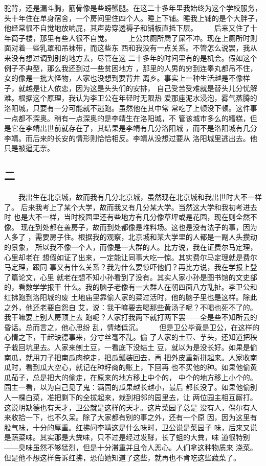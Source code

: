 驼背，还是漏斗胸，筋骨像是些螃蟹腿。在这二十多年里我始终为这个学校服务， 头十年住在单身宿舍，一个房间里住四个人。睡上下铺。睡我上铺的是个大胖子， 他经常很不自觉地放响屁，其声势穿透褥子和铺板直抵下层。 　　后来又住了十年筒子楼，那里有些人很不自觉。 　　上公共厕所屙了屎不冲。现在上厕所时则面对着—些乳罩和吊袜带，而这些东 西和我没有一点关系。不管怎么说罢，我从来没有想过调到别的地方去，尽管在这 二十多年的时间里有的是机会。假如这个例子不典型，那么我还到过一些贫困地方 ，那里的人男的穷到连睾丸都吊不住，女的像是一批大怪物，人家也没想到要背井 离乡。事实上一种生活越是不像样子，就越是让人依恋，因为这是头头们的安排， 自己受苦受难就是替头儿分忧解难。根据这个原理，我认为李卫公在年轻时无限热 爱那座泥水浸泡，雾气蒸腾的洛阳城，只要有一分可能就不逃跑。虽然他在其中常 常吃了上顿没下顿。这件事一点都不深奥。稍有一点深奥的是李靖生在洛阳城，不 管该城市多么的糟糕，但是它在李靖出世前就存在了，其结果是李靖有几分洛阳城 ，而不是洛阳城有几分李靖。而后来的长安的情形则恰恰相反。李靖从没想过要从 洛阳城里逃出去。他只是被逼无奈。 
 
 
\subsection{二} 
 
 　　我出生在北京城，故而我有几分北京城，虽然现在北京城和我出世时大不一样了。 后来我考上了某个大学，故而我又有几分某大学。当然这大学和我初考进去时 也是大不一样，当时校园里还有些地方有几分像草坪或是花园，现在则全然不像。 现在到处都在盖房子，故而到处都像是堆料场。这也是没有法子的事，因为人多了 ，需要房子住。根据我的观察，北京城和某大学里的人都是一副人头攒动的景象， 所以我不像一个人，而像是一大群的人。比方说，我在证费尔马定理，心里却老在 想假如证了出来，一定能让同事大吃一惊。其实费尔马定理就是费尔马定理，跟同 事又有什么关系？我为什么要惊吓他们？再比方说，我在学报上登了篇论文，心里 就老在想不知小孙看到了没有。其实人家小孙是图书馆的文史部的，看数学学报干 什么。我的脑子老像有一大群人在朝四面八方乱扯。李卫公和红拂跑到洛阳城的废 土地庙里靠偷人家的菜过活时，他的脑子里也是这样。除此之外，他还老要自怨自 艾，说：我干嘛要去喝那些黄汤子呢？不喝也死不了的。我干嘛要上别人房顶上去 跑呢？人家打我两下就打两下罢——全是些不知所云的昏话。总而言之，他心思纷 乱，情绪低沉。 　　但是卫公毕竟是卫公，在这样的心情之下，干起缺德事来，分寸丝毫不乱。偷 了人家的土豆、芋头，还知道把秧子栽回坑里去。人家来刨土豆，一看底下没结土 豆，就以为是没长好。如果是偷南瓜，就用刀子把南瓜肉挖走，把瓜瓤装回去，再 把外皮重新拼起来。人家收南瓜时，看到瓜大空心，就记在种籽商的账上，下回再 也不买他的种。如果他偷黄瓜茄子，总是把大的偷走，在原来的地方移上中个的， 中个的地方移上小个的。园主一看，以为自己见了鬼：满园的瓜果越长越小，最后 都长没了。如果他偷别人一棵白菜，准把剩下的全拔起来，栽到相邻的园里去，让 两位园主相互厮打。这说明缺德也有天才，卫公就是这样的天才。这片菜园子总是 没有人，偶尔有人来收拾一下，也不久呆。除了大家都有别的事之外，还有一个原 因，因为这里有股气味，十分的厚重。红拂问李靖这是什么味时，卫公说是菜园子 味，后来又说是蔬菜味。其实那是大粪味，只不过是经过发酵，长了蛆的大粪，味 道很特别——臭味虽然不够猛烈，但是十分滞重并且令人恶心。人们拿这种物质来 浇菜。但是他不想这样告诉红拂，恐伯她知道了这些，就再也不肯吃这些蔬菜了。 
 
